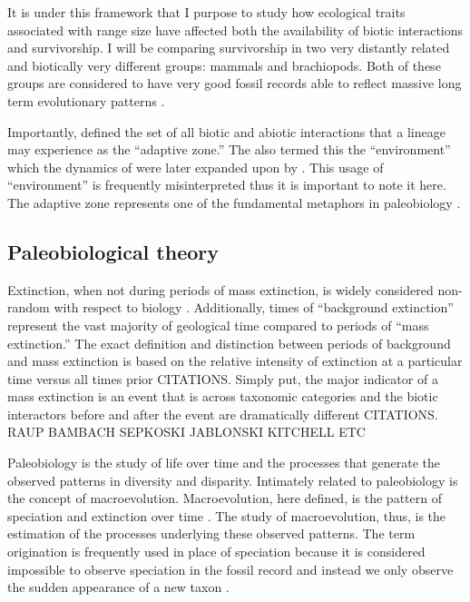 \documentclass[12pt,letterpaper]{article}
\begin{document}
It is under this framework that I purpose to study how ecological traits associated with range size have affected both the availability of biotic interactions and survivorship.
I will be comparing survivorship in two very distantly related and biotically very different groups: mammals and brachiopods. Both of these groups are considered to have very good fossil records able to reflect massive long term evolutionary patterns \citep{Mark1977}.

Importantly, \citet{Simpson1944} defined the set of all biotic and abiotic interactions that a lineage may experience as the ``adaptive zone.'' The also termed this the ``environment'' which the dynamics of were later expanded upon by \citet{VanValen1973}. This usage of ``environment'' is frequently misinterpreted thus it is important to note it here. The adaptive zone represents one of the fundamental metaphors in paleobiology \citep{Simpson1944,Simpson1953}. 







\subsection{Paleobiological theory}

Extinction, when not during periods of mass extinction, is widely considered non-random with respect to biology \citep{Jablonski1986}. Additionally, times of ``background extinction'' represent the vast majority of geological time compared to periods of ``mass extinction.'' The exact definition and distinction between periods of background and mass extinction is based on the relative intensity of extinction at a particular time versus all times prior CITATIONS. Simply put, the major indicator of a mass extinction is an event that is across taxonomic categories and the biotic interactors before and after the event are dramatically different CITATIONS. RAUP BAMBACH SEPKOSKI JABLONSKI KITCHELL ETC

Paleobiology is the study of life over time and the processes that generate the observed patterns in diversity and disparity. Intimately related to paleobiology is the concept of macroevolution. Macroevolution, here defined, is the pattern of speciation and extinction over time \citep{Jablonski2008a}. The study of macroevolution, thus, is the estimation of the processes underlying these observed patterns. The term origination is frequently used in place of speciation because it is considered impossible to observe speciation in the fossil record and instead we only observe the sudden appearance of a new taxon \citep{Coyne2004}.
\end{document}
